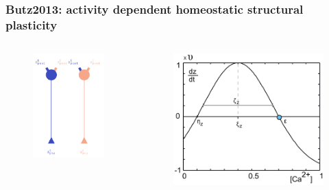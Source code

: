 \begin{frame}[c]
  \frametitle{Butz2013: activity dependent homeostatic structural plasticity}
  \begin{columns}
    \begin{column}{0.5\textwidth}
      \begin{figure}[h]
        \centering
        \includegraphics[width=0.8\linewidth]{99_images/neurons-strp}
      \end{figure}
    \end{column}
    \begin{column}{0.5\textwidth}
      \begin{figure}[h]
        \centering
        \includegraphics[width=0.8\linewidth]{99_images/growth-curve-general}
      \end{figure}
    \end{column}
  \end{columns}
\end{frame}
